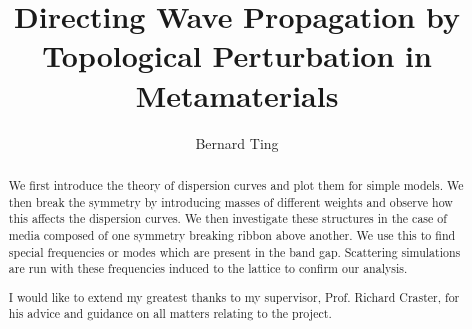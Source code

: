 \documentclass[a4paper, twoside]{report}
\title{Directing Wave Propagation by Topological Perturbation in Metamaterials}
\author{Bernard Ting}
\begin{document}


\begin{abstract}
We first introduce the theory of dispersion curves and plot them for simple
models. We then break the symmetry by introducing masses of different weights
and observe how this affects the dispersion curves. We then investigate these
structures in the case of media composed of one symmetry breaking ribbon above
another. We use this to find special frequencies or modes which are present in
the band gap. Scattering simulations are run with these frequencies induced to
the lattice to confirm our analysis.
\end{abstract}

\renewcommand{\abstractname}{Acknowledgements}
\begin{abstract}
I would like to extend my greatest thanks to my supervisor, Prof. Richard Craster, for his advice and guidance on all matters relating to the project.
\end{abstract}

\tableofcontents












\end{document}
